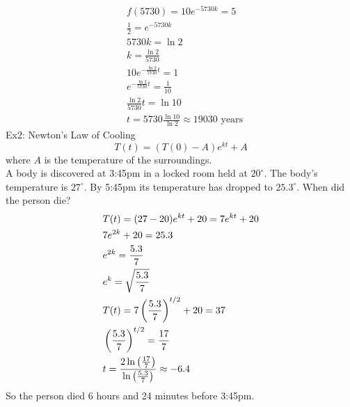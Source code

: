 \documentclass[11pt, fleqn]{article}
\begin{document}
\begin{align*}
    &f(5730)=10e^{-5730k}=5\\
    &\frac{1}{2}=e^{-5730k}\\
    &5730k=\ln 2\\
    &k=\frac{\ln 2}{5730}\\
    &10e^{-\frac{\ln 2}{5730}t}=1\\
    &e^{-\frac{\ln 2}{5730}t}=\frac{1}{10}\\
    &\frac{\ln 2}{5730}t=\ln10\\
    &t=5730\frac{\ln10}{\ln2}\approx19030\text{ years}
\end{align*}
Ex2: Newton's Law of Cooling
$$T(t)=(T(0)-A)e^{kt}+A$$
where $A$ is the temperature of the surroundings.\\
A body is discovered at 3:45pm in a locked room held at $20^\circ$. The body's temperature is $27^\circ$. By 5:45pm its temperature has dropped to $25.3^\circ$. When did the person die?
\begin{align*}
    &T(t)=(27-20)e^{kt}+20=7e^{kt}+20\\
    &7e^{2k}+20=25.3\\
    &e^{2k}=\frac{5.3}{7}\\
    &e^k=\sqrt{\frac{5.3}{7}}\\
    &T(t)=7\left( \frac{5.3}{7} \right)^{t/2}+20=37\\
    &\left( \frac{5.3}{7} \right)^{t/2}=\frac{17}{7}\\
    &t=\frac{2\ln\left( \frac{17}{7} \right)}{\ln\left( \frac{5.3}{7} \right)}\approx-6.4
\end{align*}
So the person died 6 hours and 24 minutes before 3:45pm.
\end{document}
